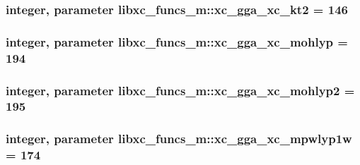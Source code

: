 \hypertarget{classlibxc__funcs__m_aca08bea09955d39fb14124b5a2415782}{
\subsubsection[{xc\-\_\-gga\-\_\-xc\-\_\-kt2}]{\setlength{\rightskip}{0pt plus 5cm}integer, parameter libxc\-\_\-funcs\-\_\-m\-::xc\-\_\-gga\-\_\-xc\-\_\-kt2 = 146}}\label{classlibxc__funcs__m_aca08bea09955d39fb14124b5a2415782}
\hypertarget{classlibxc__funcs__m_af627a530ca1f867510017b189507dfec}{
\subsubsection[{xc\-\_\-gga\-\_\-xc\-\_\-mohlyp}]{\setlength{\rightskip}{0pt plus 5cm}integer, parameter libxc\-\_\-funcs\-\_\-m\-::xc\-\_\-gga\-\_\-xc\-\_\-mohlyp = 194}}\label{classlibxc__funcs__m_af627a530ca1f867510017b189507dfec}
\hypertarget{classlibxc__funcs__m_a85e87e7fd208c942e92ea7ba65d059a5}{
\subsubsection[{xc\-\_\-gga\-\_\-xc\-\_\-mohlyp2}]{\setlength{\rightskip}{0pt plus 5cm}integer, parameter libxc\-\_\-funcs\-\_\-m\-::xc\-\_\-gga\-\_\-xc\-\_\-mohlyp2 = 195}}\label{classlibxc__funcs__m_a85e87e7fd208c942e92ea7ba65d059a5}
\hypertarget{classlibxc__funcs__m_a8b0834f3b5fe226afe4e2c9990d6fd74}{
\subsubsection[{xc\-\_\-gga\-\_\-xc\-\_\-mpwlyp1w}]{\setlength{\rightskip}{0pt plus 5cm}integer, parameter libxc\-\_\-funcs\-\_\-m\-::xc\-\_\-gga\-\_\-xc\-\_\-mpwlyp1w = 174}}\label{classlibxc__funcs__m_a8b0834f3b5fe226afe4e2c9990d6fd74}
